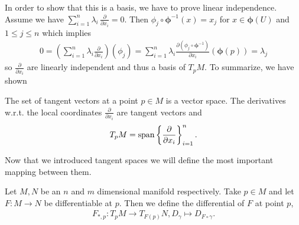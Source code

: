 \documentclass[../master_thesis.tex]{subfiles}
\begin{document}
In order to show that this is a basis, we have to prove linear independence.
Assume we have $\sum_{i=1}^n \lambda_i \, \frac{\partial}{\partial x_i} = 0$.
Then $\phi_j \circ \bm{\phi}^{-1} (x) = x_j$ for $x \in \bm{\phi}(U)$ and 
$1 \leq j \leq n$ 
which implies
\begin{align*}
    0 = \left( \sum\limits_{i=1}^n \lambda_i \frac{\partial}{\partial x_i}
        \right) (\phi_j)
    = \sum\limits_{i=1}^n \lambda_i \frac{\partial (\phi_j \circ \bm{\phi}^{-1})}{\partial x_i}(\bm{\phi}(p))
    = \lambda_j
\end{align*}
so $\frac{\partial}{\partial x_i}$ are
linearly independent and thus a basis of $T_p M$. To summarize, we have shown
\begin{proposition}
    The set of tangent vectors at a point $p \in M$ is a vector space. 
    The derivatives w.r.t. the local coordinates $\frac{\partial}{\partial x_i}$ 
    are tangent vectors and 
    \begin{align*}
        T_p M = \operatorname{span} \left\{ \frac{\partial}{\partial x_i} \right\} _{i=1}^n.
    \end{align*}
\end{proposition}

Now that we introduced tangent spaces we will define the most important 
mapping between them.
\begin{definition}[Differential]
    Let $M, N$ be an $n$ and $m$ dimensional manifold respectively. 
    Take $p \in M$ and let $F:M \rightarrow N$ be differentiable at $p$. 
    Then we define the differential of $F$ at point $p$,
    \begin{align*}
        F_{*,p}: T_p M \rightarrow T_{F(p)} N, D_\gamma \mapsto D_{F\circ \gamma}.
    \end{align*}
\end{definition}
\end{document}
